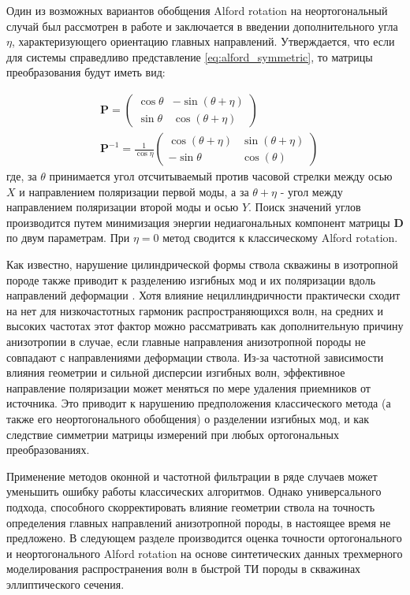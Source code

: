 \documentclass[a4paper,11pt]{article}
\begin{document}
Один из возможных вариантов обобщения Alford rotation на неортогональный случай был рассмотрен в работе \cite{Dellinger1998} и заключается в введении дополнительного угла $\eta$, характеризующего ориентацию главных направлений. Утверждается, что если для системы справедливо представление \eqref{eq:alford_symmetric}, то матрицы преобразования будут иметь вид:

\begin{align*}
&\mathbf{P} = \left(
\begin{array}{cc}
\cos \theta & -\sin (\theta+\eta) \\ 
\sin \theta & \cos (\theta+\eta)
\end{array} 
\right) \\
&\mathbf{P}^{-1} = \frac{1}{\cos \eta} \left(
\begin{array}{cc}
\cos (\theta+\eta) & \sin (\theta+\eta) \\ 
-\sin \theta & \cos (\theta)
\end{array} 
\right)
\end{align*}
где, за $\theta$ принимается угол отсчитываемый против часовой стрелки между осью $X$ и направлением поляризации первой моды, а за $\theta + \eta$ - угол между направлением поляризации второй моды и осью $Y$. Поиск значений углов производится путем минимизация энергии недиагональных компонент матрицы $\mathbf{D}$ по двум параметрам. При $\eta=0$ метод сводится к классическому Alford rotation. 

Как известно, нарушение цилиндрической формы ствола скважины в изотропной породе также приводит к разделению изгибных мод и их поляризации вдоль направлений деформации \cite{Seroices2010}. Хотя влияние нециллиндричности практически сходит на нет для низкочастотных гармоник распространяющихся волн, на средних и высоких частотах этот фактор можно рассматривать как дополнительную причину анизотропии в случае, если главные направления анизотропной породы не совпадают с направлениями деформации ствола. Из-за частотной зависимости влияния геометрии и сильной дисперсии изгибных волн, эффективное направление поляризации может меняться по мере удаления приемников от источника. Это приводит к нарушению предположения классического метода (а также его неортогонального обобщения) о разделении изгибных мод, и как следствие симметрии матрицы измерений при любых ортогональных преобразованиях. 

Применение методов оконной и частотной фильтрации в ряде случаев может уменьшить ошибку работы классических алгоритмов. Однако универсального подхода, способного скорректировать влияние геометрии ствола на точность определения главных направлений анизотропной породы, в настоящее время не предложено. В следующем разделе производится оценка точности ортогонального и неортогонального Alford rotation на основе синтетических данных трехмерного моделирования распространения волн в быстрой ТИ породы в скважинах эллиптического сечения.  
\end{document}
